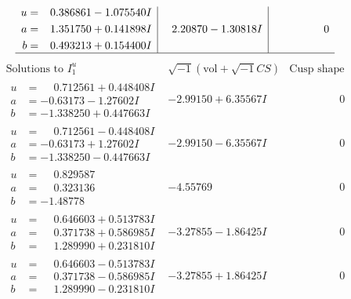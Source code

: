 \documentclass[1p]{elsarticle_modified}
\theoremstyle{definition}
\newcommand{\I}{\sqrt{-1}}
\begin{document}
$$\begin{array}{c|c|c}
\begin{aligned}
u &= \phantom{-}0.386861 - 1.075540 I \\
a &= \phantom{-}1.351750 + 0.141898 I \\
b &= \phantom{-}0.493213 + 0.154400 I\end{aligned}
 & \phantom{-}2.20870 - 1.30818 I & \phantom{-0.000000 } 0\\
 \hline 
 \end{array}$$\newpage$$\begin{array}{c|c|c}  
\text{Solutions to }I^u_{1}& \I (\text{vol} + \sqrt{-1}CS) & \text{Cusp shape}\\
 \hline 
\begin{aligned}
u &= \phantom{-}0.712561 + 0.448408 I \\
a &= -0.63173 - 1.27602 I \\
b &= -1.338250 + 0.447663 I\end{aligned}
 & -2.99150 + 6.35567 I & \phantom{-0.000000 } 0 \\ \hline\begin{aligned}
u &= \phantom{-}0.712561 - 0.448408 I \\
a &= -0.63173 + 1.27602 I \\
b &= -1.338250 - 0.447663 I\end{aligned}
 & -2.99150 - 6.35567 I & \phantom{-0.000000 } 0 \\ \hline\begin{aligned}
u &= \phantom{-}0.829587\phantom{ +0.000000I} \\
a &= \phantom{-}0.323136\phantom{ +0.000000I} \\
b &= -1.48778\phantom{ +0.000000I}\end{aligned}
 & -4.55769\phantom{ +0.000000I} & \phantom{-0.000000 } 0 \\ \hline\begin{aligned}
u &= \phantom{-}0.646603 + 0.513783 I \\
a &= \phantom{-}0.371738 + 0.586985 I \\
b &= \phantom{-}1.289990 + 0.231810 I\end{aligned}
 & -3.27855 - 1.86425 I & \phantom{-0.000000 } 0 \\ \hline\begin{aligned}
u &= \phantom{-}0.646603 - 0.513783 I \\
a &= \phantom{-}0.371738 - 0.586985 I \\
b &= \phantom{-}1.289990 - 0.231810 I\end{aligned}
 & -3.27855 + 1.86425 I & \phantom{-0.000000 } 0 \\ \hline\begin{aligned}

\end{aligned}
\end{array}$$
\end{document}
